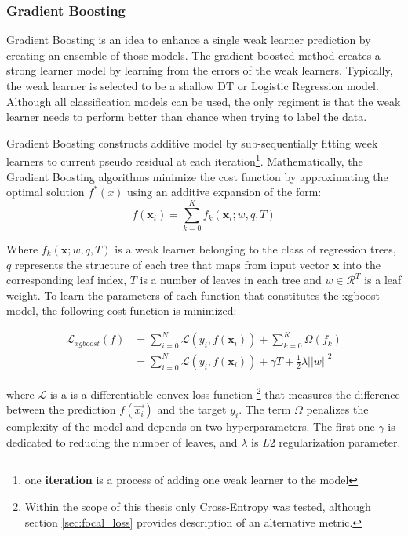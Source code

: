 \subsubsection{Gradient Boosting}

Gradient Boosting is an idea to enhance a single weak learner prediction by creating an ensemble of those models. The gradient boosted method creates a strong learner model by learning from the errors of the weak learners. Typically, the weak learner is selected to be a shallow DT or Logistic Regression model. Although all classification models can be used, the only regiment is that the weak learner needs to perform better than chance when trying to label the data.     

Gradient Boosting constructs additive model by sub-sequentially fitting week learners to current pseudo residual at each iteration\footnote{one \textbf{iteration} is a process of adding one weak learner to the model}. Mathematically, the Gradient Boosting algorithms minimize the cost function by approximating the optimal solution $f^*(x)$ using an additive expansion of the form:
\begin{equation} 
    f(\textbf{x}_i) = \sum_{k=0}^{K} f_k(\textbf{x}_i; w, q, T)
\end{equation}

Where $f_k(\textbf{x}; w, q, T)$ is a weak learner belonging to the class of regression trees, $q$ represents the structure of each tree that maps from input vector $\textbf{x}$ into the corresponding leaf index, $T$ is a number of leaves in each tree and $w \in \mathcal{R}^{T}$ is a leaf weight. To learn the parameters of each function that constitutes the xgboost model, the following cost function is minimized:

\begin{equation}
\label{eq:xgboost_loss}
\begin{split}
    \mathcal{L}_{xgboost}(f) &= \sum_{i=0}^{N} \mathcal{L}(y_i, f(\mathbf{x}_i)) + \sum_{k=0}^{K}\Omega(f_{k})  \\ 
&= \sum_{i=0}^{N} \mathcal{L}(y_i, f(\mathbf{x}_i))  + \gamma T +\frac{1}{2}\lambda ||w||^{2}
\end{split}
\end{equation}

where $\mathcal{L}$ is a is a differentiable convex loss function \footnote{Within the scope of this thesis only Cross-Entropy was tested, although section \ref{sec:focal_loss} provides description of an alternative metric.} that measures the difference between the prediction $f(\vec{x_i})$ and the target $y_i$. 
The term $\Omega$ penalizes the complexity of the model and depends on two hyperparameters. The first one $\gamma$ is dedicated to reducing the number of leaves, and $\lambda$ is $L2$ regularization parameter. 

